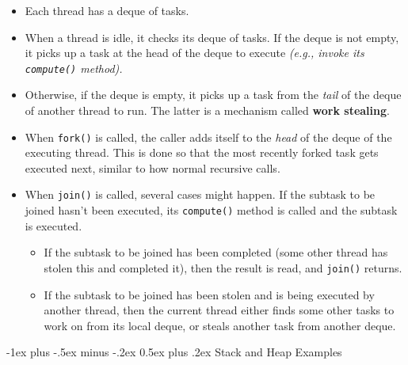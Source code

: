 \documentclass[10pt, landscape]{article}
\makeatletter
\renewcommand{\section}{\@startsection{section}{1}{0mm}%
                                {-1ex plus -.5ex minus -.2ex}%
                                {0.5ex plus .2ex}%
                                {\normalfont\large\bfseries}}
\newcommand{\code}[1]{\textcolor{mygreen}{\texttt{#1}}}
\makeatother
\begin{document}
\begin{multicols}{2}
\begin{itemize}
    \item Each thread has a deque of tasks.
    \item When a thread is idle, it checks its deque of tasks. If the deque is not empty, it picks up a task at the head of the deque to execute \textit{(e.g., invoke its \code{compute()} method).}
    \item Otherwise, if the deque is empty, it picks up a task from the \textit{tail} of the deque of another thread to run. The latter is a mechanism called \textbf{work stealing}.
    \item When \code{fork()} is called, the caller adds itself to the \textit{head} of the deque of the executing thread. This is done so that the most recently forked task gets executed next, similar to how normal recursive calls.
    \item When \code{join()} is called, several cases might happen. If the subtask to be joined hasn't been executed, its \code{compute()} method is called and the subtask is executed.
    \begin{itemize}
        \item If the subtask to be joined has been completed (some other thread has stolen this and completed it), then the result is read, and \code{join()} returns.
        \item If the subtask to be joined has been stolen and is being executed by another thread, then the current thread either finds some other tasks to work on from its local deque, or steals another task from another deque.
    \end{itemize}
\end{itemize}




\end{multicols}

\hline
\section{Stack and Heap Examples}
\end{document}
